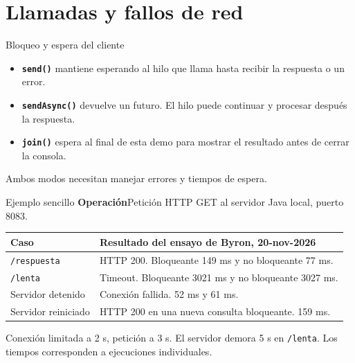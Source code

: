 \bloque{\personaCuatro}
\section{Llamadas y fallos de red}
\begin{frame}{Bloqueo y espera del cliente}\relax
\begin{itemize}
  \item \textbf{\texttt{send()}} mantiene esperando al hilo que llama hasta recibir la respuesta o un error.
  \item \textbf{\texttt{sendAsync()}} devuelve un futuro. El hilo puede continuar y procesar después la respuesta.
  \item \textbf{\texttt{join()}} espera al final de esta demo para mostrar el resultado antes de cerrar la consola.
\end{itemize}
\medskip
{\small Ambos modos necesitan manejar errores y tiempos de espera. \cite{java17httpclient,java17httprequest}}
\end{frame}

\begin{frame}{Ejemplo sencillo}\relax
\small
\textbf{Operación}\quad Petición HTTP GET al servidor Java local, puerto 8083.
\medskip
\begin{tabularx}{\linewidth}{|l|X|}
\hline
\textbf{Caso} & \textbf{Resultado del ensayo de Byron, 20-nov-2026}\\\hline
\texttt{/respuesta} & HTTP 200. Bloqueante 149 ms y no bloqueante 77 ms.\\\hline
\texttt{/lenta} & Timeout. Bloqueante 3021 ms y no bloqueante 3027 ms.\\\hline
Servidor detenido & Conexión fallida. 52 ms y 61 ms.\\\hline
Servidor reiniciado & HTTP 200 en una nueva consulta bloqueante. 159 ms.\\\hline
\end{tabularx}
\medskip
{\footnotesize Conexión limitada a 2 s, petición a 3 s. El servidor demora 5 s en \texttt{/lenta}. Los tiempos corresponden a ejecuciones individuales.}
\end{frame}

